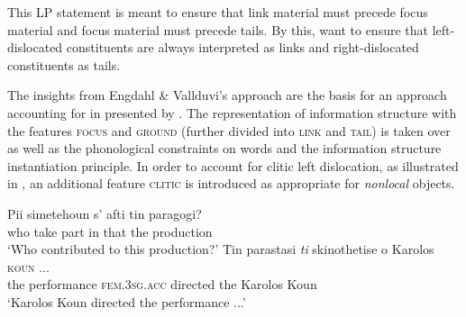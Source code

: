 \documentclass[output=paper]{langsci/langscibook}
\begin{document}
  \label{fig:lp-catalan}
\z
This LP statement is meant to ensure that link material must precede
focus material and focus material must precede tails. By this,
\cite{EV96a} want to ensure that left-dislocated constituents are always
interpreted as links and right-dislocated constituents as tails.

The insights from Engdahl \& Vallduvi's approach are the basis for an
approach accounting for  in  presented by
\cite{AK2002a}. The representation of information structure with the
features \textsc{focus} and \textsc{ground} (further divided into
\textsc{link} and \textsc{tail}) is taken over as well as the
phonological constraints on words and the information structure
instantiation principle. In order to account for clitic left
dislocation, as illustrated in , an
additional feature \textsc{clitic} is introduced as appropriate for
\textit{nonlocal} objects.

\begin{exe}
  \ex\label{ex:clld-greek}
  \begin{xlist}
    \ex \gll Pii simetehoun s' afti tin paragogi?\\
             who {take part} in that the production\\
    \trans `Who contributed to this production?'
    \ex \gll Tin parastasi \textit{ti} skinothetise o Karolos \textsc{koun} ...\\
    the performance  \textsc{fem.3sg.acc} directed the Karolos Koun\\
   \trans `Karolos Koun directed the performance ...'
  \end{xlist}

\end{exe}
\end{document}
